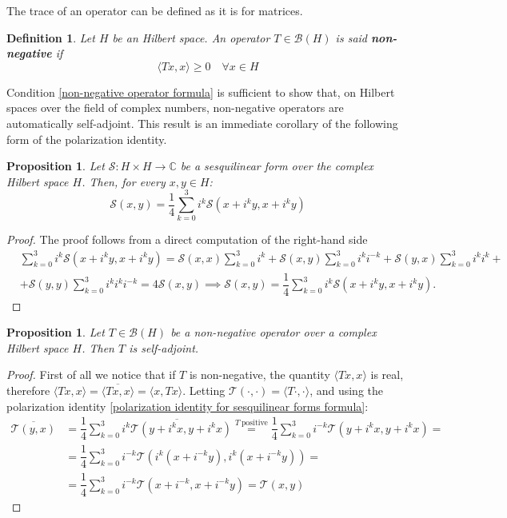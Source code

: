 \documentclass[corpo=11pt, stile=classica, tipotesi=custom,
greek, evenboxes, english]{toptesi}
\numberwithin{equation}{chapter}
\newtheorem{defi}[teo]{Definition}
\newtheorem{prop}[teo]{Proposition}
\theoremstyle{remark}
\newcommand{\C}{\mathbb{C}} %
\newcommand{\B}{\mathscr{B}} %
\begin{document}
The trace of an operator can be defined as it is for matrices.
\begin{defi}\label{non-negative operator}
	Let $H$ be an Hilbert space. An operator $T \in \B(H)$ is said \textbf{non-negative} if
	\begin{equation}\label{non-negative operator formula}
		\langle T x, x \rangle \geq 0 \quad \forall x \in H
	\end{equation}
\end{defi}
Condition \eqref{non-negative operator formula} is sufficient to show that, on Hilbert spaces over the field of complex numbers, non-negative operators are automatically self-adjoint. This result is an immediate corollary of the following form of the polarization identity.
\begin{prop}\label{polarization identity for sesquilinear forms}
	Let $\mathcal{S} : H \times H \rightarrow \C$ be a sesquilinear form over the complex Hilbert space $H$. Then, for every $x,y \in H$:
	\begin{equation}\label{polarization identity for sesquilinear forms formula}
		\mathcal{S}(x,y) = \dfrac{1}{4}\sum_{k=0}^3 i^k \mathcal{S}(x + i^k y, x + i^k y)
	\end{equation}
\end{prop}
\begin{proof}
	The proof follows from a direct computation of the right-hand side
	\begin{align*}
		&\sum_{k=0}^3 i^k \mathcal{S}(x + i^k y, x + i^k y) = \mathcal{S}(x,x)\sum_{k=0}^{3}i^k + \mathcal{S}(x,y) \sum_{k=0}^{3} i^k i^{-k} + \mathcal{S}(y,x) \sum_{k=0}^{3} i^k i^k+\\
		&+ \mathcal{S}(y,y)\sum_{k=0}^{3} i^k i^k i^{-k} = 4 \mathcal{S}(x,y) \implies \mathcal{S}(x,y) = \dfrac{1}{4}\sum_{k=0}^3 i^k \mathcal{S}(x + i^k y, x + i^k y).
	\end{align*}
\end{proof}
\begin{prop}\label{positive operators are self-adjoint}
	Let $T \in \B(H)$ be a non-negative operator over a complex Hilbert space $H$. Then $T$ is self-adjoint.
\end{prop}
\begin{proof}
	First of all we notice that if $T$ is non-negative, the quantity $\langle Tx,x \rangle$ is real, therefore $\langle Tx,x \rangle = \overline{\langle Tx,x \rangle} = \langle x,Tx \rangle$. Letting $\mathcal{T}(\cdot,\cdot) = \langle T \cdot, \cdot \rangle$, and using the polarization identity \eqref{polarization identity for sesquilinear forms formula}:
	\begin{align}
		\overline{\mathcal{T}(y,x)} &= \dfrac{1}{4}\sum_{k=0}^{3}  \overline{i^{k}\mathcal{T}(y + i^k x, y + i^k x)} \overset{T\ \mathrm{positive}}{=} \dfrac{1}{4}\sum_{k=0}^{3} i^{-k} \mathcal{T}(y + i^k x, y + i^k x) =\nonumber\\
									&= \dfrac{1}{4}\sum_{k=0}^{3} i^{-k} \mathcal{T}\left(i^k(x + i^{-k}y), i^k(x + i^{-k}y)\right) = \\
									&= \dfrac{1}{4}\sum_{k=0}^{3} i^{-k} \mathcal{T}(x + i^{-k}, x + i^{-k}y) = \mathcal{T}(x,y) \label{polarization identity}
	\end{align}
\end{proof}
\end{document}
